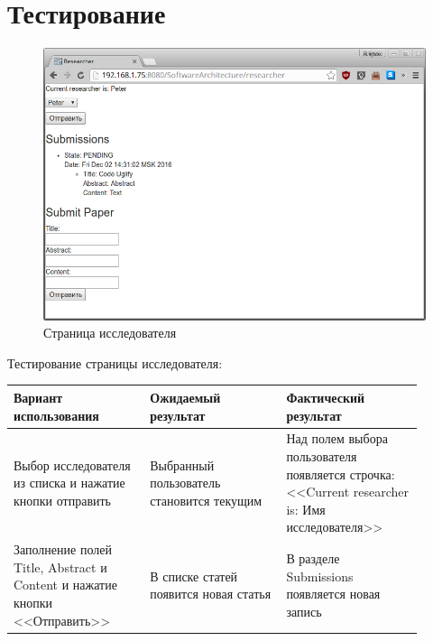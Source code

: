 \section{Тестирование}
\begin{figure}[H]
\centering
\includegraphics[width=\textwidth]{researcher.png}
\caption{Страница исследователя}
\end{figure}
Тестирование страницы исследователя:
\begin{center}
	\begin{longtable}{|p{0.3\linewidth}|p{0.3\linewidth}|p{0.3\linewidth}|}
		\hline
		\textbf{Вариант использования} & \textbf{Ожидаемый результат}&
		\textbf{Фактический результат}\\
		\hline
		Выбор исследователя из списка и нажатие кнопки отправить & Выбранный пользователь становится текущим & Над полем выбора пользователя появляется строчка: <<Current researcher is: Имя исследователя>> \\
		\hline
		Заполнение полей Title, Abstract и Content и нажатие кнопки <<Отправить>> & В списке статей появится новая статья & В разделе Submissions появляется новая запись \\
		\hline
	\end{longtable}
\end{center}

